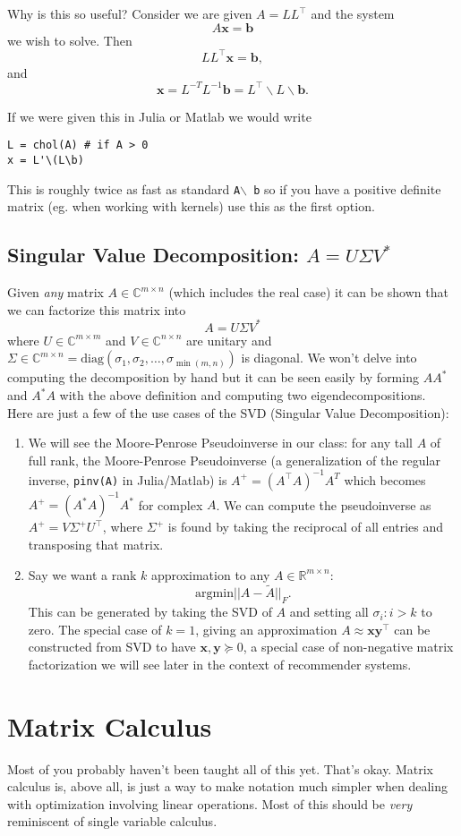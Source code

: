 \documentclass{article}
\newcommand{\1}{\mathbf{1}}
\newcommand{\0}{\mathbf{0}}
\newcommand{\xx}{\mathbf{x}}
\newcommand{\yy}{\mathbf{y}}
\newcommand{\bb}{\mathbf{b}}
\newcommand{\RR}{\mathbb{R}}
\newcommand{\CC}{\mathbb{C}}
\newcommand{\T}{\top}
\newcommand{\argmin}{\mathrm{argmin}}
\begin{document}
Why is this so useful? Consider we are given $A=LL^\T$ and the system
\[
    A\xx = \bb
\]
we wish to solve. Then
\[
    LL^\T\xx = \bb,
\]
and
\[
    \xx = L^{-T}L^{-1}\bb = L^\T\backslash L \backslash \bb.
\]

If we were given this in Julia or Matlab we would write
{
\par
\ttfamily\small
\begin{verbatim}
L = chol(A) # if A > 0
x = L'\(L\b)
\end{verbatim}
\par
}
This is roughly twice as fast as standard \texttt{A$\backslash$ b}
so if you have a positive definite matrix (eg. when working with
kernels) use this as the first option.

\subsection{Singular Value Decomposition: $A = U\Sigma V^*$}

Given \textit{any} matrix $A\in\CC^{m\times n}$ (which includes the real
case) it can be shown that we can factorize this matrix into
\[
    A = U\Sigma V^*
\]
where $U\in\CC^{m\times m}$ and $V\in\CC^{n\times n}$ are unitary and
$\Sigma\in\CC^{m\times n} = \mathrm{diag}(\sigma_1, \sigma_2,\dots,
\sigma_{\min(m,n)})$ is diagonal. We won't delve into computing the
decomposition by hand but it can be seen easily by forming $AA^*$ and
$A^*A$ with the above definition and computing two eigendecompositions.\\

Here are just a few of the use cases of the SVD (Singular Value Decomposition):
\begin{enumerate}
\item We will see the Moore-Penrose Pseudoinverse in our class: for any
    tall $A$ of full rank, the Moore-Penrose Pseudoinverse (a generalization
    of the regular inverse, \texttt{pinv(A)} in Julia/Matlab) is
    $A^+ = (A^\T A)^{-1}A^T$ which becomes $A^+ = (A^*A)^{-1}A^*$ for complex
    $A$. We can compute the pseudoinverse as $A^+ = V\Sigma^+ U^\T$, where
    $\Sigma^+$ is found by taking the reciprocal of all entries and transposing
    that matrix.
\item Say we want a rank $k$ approximation to any $A\in\RR^{m\times n}$:
    \[
        \argmin || A - \tilde A ||_F.
    \]
    This can be generated by taking the SVD of $A$ and setting all
    $\sigma_i : i > k$ to zero. The special case of $k=1$, giving an
    approximation $A \approx \xx\yy^\T$ can be constructed from SVD
    to have $\xx,\yy \succeq 0$, a special case of non-negative matrix
    factorization we will see later in the context of recommender systems.
\end{enumerate}

\section{Matrix Calculus}

Most of you probably haven't been taught all of this yet. That's okay. Matrix calculus
is, above all, is just a way to make notation much simpler when dealing with
optimization involving linear operations. Most of this should be \textit{very}
reminiscent of single variable calculus.
\end{document}
